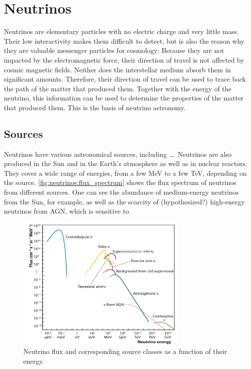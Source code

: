 \section{Neutrinos}

Neutrinos are elementary particles with no electric charge and very little mass.
Their low interactivity
  makes them difficult to detect,
  but is also the reason why they are valuable messenger particles for cosmology:
Because they are not impacted by the electromagnetic force,
  their direction of travel is not affected by cosmic magnetic fields.
Neither does the interstellar medium absorb them in significant amounts.
Therefore,
  their direction of travel can be used to trace back the path of the matter that produced them.
Together with the energy of the neutrino,
  this information can be used to determine the properties of the matter that produced them.
This is the basis of neutrino astronomy.


\subsection{Sources}
Neutrinos have various astronomical sources,
including
  …. %
Neutrinos are also produced in
  the Sun
  and in the Earth's atmosphere
  as well as in nuclear reactors.
They cover a wide range of energies, from a few MeV to a few TeV,
  depending on the source.
%
\autoref{fig:neutrinos:flux_spectrum} shows the flux spectrum of neutrinos from different sources.
One can see
  the abundance of medium-energy neutrinos from the Sun,
    for example,
  as well as the scarcity of (hypothesized?) high-energy neutrinos from AGN,
    which \icecube is sensitive to.

\begin{figure}
  \centering
  \includegraphics[width=0.75\textwidth]{content/plots/halftime/neutrinos-energy.png}
  \caption{Neutrino flux and corresponding source classes as a function of their energy. \citationneeded{}}
  \label{fig:neutrinos:flux_spectrum}
\end{figure}


